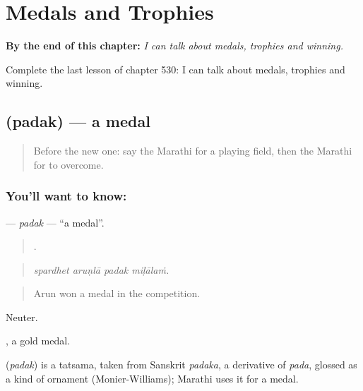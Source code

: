 
\chapter{Medals and Trophies}
\label{ch:mr-medals-and-trophies}

\begin{chapteropening}
\textbf{By the end of this chapter:} \emph{I can talk about medals, trophies and winning.}

Complete the last lesson of chapter 530: I can talk about medals, trophies and winning.
\end{chapteropening}

\section[\texorpdfstring{\mr{पदक} (padak)}{पदक (padak)}]{ (padak) — a medal}

\label{lesson:MR-C530-padak}



\begin{quote}
Before the new one: say the Marathi for a playing field, then the Marathi for to overcome.
\end{quote}

\subsection*{You'll want to know: }
\textbf{} — \emph{padak} — \textquotedblleft{}a medal\textquotedblright{}.

\begin{quote}
   .
\end{quote}

\begin{quote}
\emph{spardhet aruṇlā padak miḷālaṁ.}
\end{quote}

\begin{quote}
Arun won a medal in the competition.
\end{quote}

Neuter.

, a gold medal.

\begin{cousinweb}
\textbf{} (\emph{padak}) is a tatsama, taken from Sanskrit \emph{padaka}, a derivative of \emph{pada}, glossed as a kind of ornament (Monier-Williams); Marathi uses it for a medal.
\end{cousinweb}

